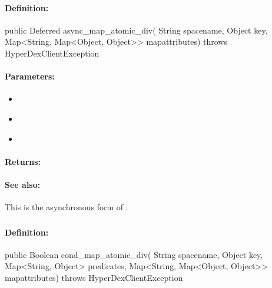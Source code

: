 \paragraph{Definition:}
\begin{javacode}
public Deferred async_map_atomic_div(
        String spacename,
        Object key,
        Map<String, Map<Object, Object>> mapattributes) throws HyperDexClientException
\end{javacode}

\paragraph{Parameters:}
\begin{itemize}[noitemsep]
\item {}\\

\item {}\\

\item {}\\

\end{itemize}

\paragraph{Returns:}


\paragraph{See also:}  This is the asynchronous form of .

\pagebreak
\subsubsection{}
\label{api:java:cond_map_atomic_div}


\paragraph{Definition:}
\begin{javacode}
public Boolean cond_map_atomic_div(
        String spacename,
        Object key,
        Map<String, Object> predicates,
        Map<String, Map<Object, Object>> mapattributes) throws HyperDexClientException
\end{javacode}

